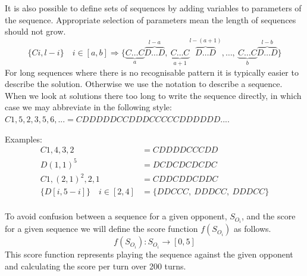 It is also possible to define sets of sequences by adding variables to parameters of the sequence.
Appropriate selection of parameters mean the length of sequences should not grow.
\[ \{Ci,l-i\} \quad i\in [a,b] \Rightarrow \{\underbrace{C\ldots C}_{a}\overbrace{D\ldots D}^{l-a},\ \underbrace{C\ldots C}_{a+1}\overbrace{D\ldots D}^{l-(a+1)},\ldots ,\ \underbrace{C\ldots C}_{b}\overbrace{D\ldots D}^{l-b}\} \]
For long sequences where there is no recognisable pattern it is typically easier to describe the solution.
Otherwise we use the notation to describe a sequence.
When we look at solutions there too long to write the sequence directly, in which case we may abbreviate in the following style: $C1,5,2,3,5,6,...=CDDDDDCCDDDCCCCCDDDDDD...$.

Examples:
\begin{align}
    C1,4,3,2 &= CDDDDCCCDD\\
    D(1,1)^{5} &= DCDCDCDCDC\\
    C1,(2,1)^{2},2,1 &= CDDCDDCDDC\\
    \{D[i,5-i]\} \quad i\in [2,4] &= \{DDCCC,\ DDDCC,\ DDDCC\}\\
\end{align}

To avoid confusion between a sequence for a given opponent, $S_{O_i}$, and the score for a given sequence we will define the score function $f(S_{O_i})$ as follows.
$$f(S_{O_i}):S_{O_i} \rightarrow [0,5]$$
This score function represents playing the sequence against the given opponent and calculating the score per turn over 200 turns.


